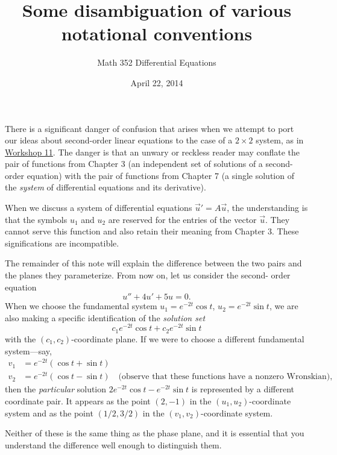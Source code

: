 \documentclass[12pt,twoside]{article}
\title{Some disambiguation of various notational conventions}
\author{Math 352 Differential Equations}
\date{April 22, 2014}
\begin{document}
\thispagestyle{empty}
\maketitle



There is a significant danger of confusion that arises when we attempt to port
our ideas about second-order linear equations to the case of a $2 \times 2$
system, as in \href{../../workshops/11/PhasePortraits.pdf}{Workshop 11}. The
danger is that an unwary or reckless reader may conflate the pair of functions
from Chapter 3 (an independent set of solutions of a second-order equation)
with the pair of functions from Chapter 7 (a single solution of the
\emph{system} of differential equations and its derivative).

When we discuss a system of differential equations $\vec{u}' = A\vec{u}$, the
understanding is that the  symbols $u_1$ and $u_2$ are reserved for the
entries of the vector $\vec{u}$. They cannot serve this function and also
retain their meaning from Chapter 3. These significations are incompatible.

The remainder of this note will explain the difference between the two pairs
and the planes they parameterize. From now on, let us consider the second-
order equation
\begin{equation} \label{eq:main}
    u'' + 4u' + 5u = 0.
\end{equation}
When we choose the fundamental system $u_1 = e^{-2t} \cos{t}$,
$u_2 = e^{-2t} \sin{t}$, we are also making a specific identification
of the \emph{solution set}
\begin{equation*}
    c_1 e^{-2t} \cos{t} + c_2 e^{-2t} \sin{t}
\end{equation*}
with the $(c_1, c_2)$-coordinate plane. If we were to choose a different 
fundamental system---say, 
\begin{align*}
    v_1 &= e^{-2t} (\cos{t} + \sin{t}) \\
    v_2 &= e^{-2t} (\cos{t} - \sin{t}) \quad \text{(observe that these
        functions have a nonzero Wronskian)},
\end{align*}
then the \emph{particular} solution
$2e^{-2t} \cos{t} - e^{-2t} \sin{t}$ is represented by a different coordinate
pair. It appears as the point $(2, -1)$ in the $(u_1,u_2)$-coordinate system
and as the point $(1/2,3/2)$ in the $(v_1,v_2)$-coordinate system.

Neither of these is the same thing as the phase plane, and it is essential
that you understand the difference well enough to distinguish them.
\end{document}
